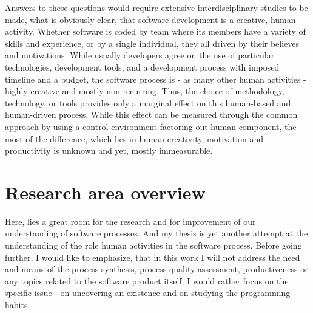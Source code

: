 Answers to these questions would require extensive interdisciplinary studies to be made, what is 
obviously clear, that software development is a creative, human activity. Whether software is coded 
by team where its members have a variety of skills and experience, or by a single individual,
they all driven by their believes and motivations. While usually developers agree on the use of 
particular technologies, development tools, and a development process with imposed timeline and 
a budget, the software process is - as many other human activities - highly creative and mostly 
non-recurring. Thus, the choice of methodology, technology, or tools provides only a marginal 
effect on this human-based and human-driven process. While this effect can be measured through 
the common approach by using a control environment factoring out human component, the most of 
the difference, which lies in human creativity, motivation and productivity is unknown and yet, 
mostly immeasurable.

\section{Research area overview}
Here, lies a great room for the research and for improvement of our understanding of software 
processes. And my thesis is yet another attempt at the understanding of the role human activities 
in the software process. Before going further, I would like to emphasize, that in this work I will not 
address the need and means of the process synthesis, process quality assessment, productiveness
or any topics related to the software product itself; I would rather focus on the specific issue - 
on uncovering an existence and on studying the programming habits. 

